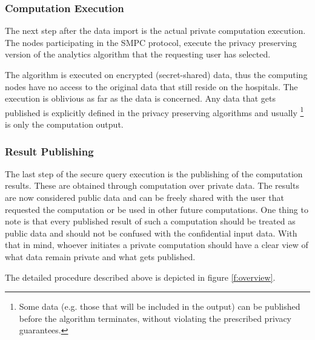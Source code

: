 \subsubsection{Computation Execution}\label{sss:computation-execution}

The next step after the data import is the actual private computation execution.
The nodes participating in the SMPC protocol, execute the privacy preserving version of the analytics algorithm that the requesting user has selected.

The algorithm is executed on encrypted (secret\hyp shared) data, thus the computing nodes have no access to the original data that still reside on the hospitals.
The execution is oblivious as far as the data is concerned.
Any data that gets published is explicitly defined in the privacy preserving algorithms and usually \footnote{Some data (e.g. those that will be included in the output) can be published before the algorithm terminates, without violating the prescribed privacy guarantees.} is only the computation output.

\subsubsection{Result Publishing}\label{sss:result-publishing}

The last step of the secure query execution is the publishing of the computation results.
These are obtained through computation over private data.
The results are now considered public data and can be freely shared with the user that requested the computation or be used in other future computations.
One thing to note is that every published result of such a computation should be treated as public data and should not be confused with the confidential input data.
With that in mind, whoever initiates a private computation should have a clear view of what data remain private and what gets published.


The detailed procedure described above is depicted in figure \ref{f:overview}.

